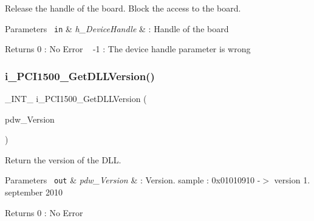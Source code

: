 Release the handle of the board. Block the access to the board.


\begin{DoxyParams}[1]{Parameters}
\mbox{\texttt{ in}}  & {\em h\+\_\+\+Device\+Handle} & \+: Handle of the board\\
\hline
\end{DoxyParams}
\begin{DoxyReturn}{Returns}
0 \+: No Error ~\newline
 -\/1 \+: The device handle parameter is wrong ~\newline

\end{DoxyReturn}
\mbox{\label{group___general_ga0ddc2b5875603b239ed35ff451099799}} 
\subsubsection{\texorpdfstring{i\_PCI1500\_GetDLLVersion()}{i\_PCI1500\_GetDLLVersion()}}
{\footnotesize\ttfamily \+\_\+\+I\+N\+T\+\_\+ i\+\_\+\+P\+C\+I1500\+\_\+\+Get\+D\+L\+L\+Version (\begin{DoxyParamCaption}\item[{P\+D\+W\+O\+RD}]{pdw\+\_\+\+Version }\end{DoxyParamCaption})}

Return the version of the D\+LL.


\begin{DoxyParams}[1]{Parameters}
\mbox{\texttt{ out}}  & {\em pdw\+\_\+\+Version} & \+: Version. sample \+: 0x01010910 -\/$>$ version 1. september 2010\\
\hline
\end{DoxyParams}
\begin{DoxyReturn}{Returns}
0 \+: No Error ~\newline

\end{DoxyReturn}
\mbox{\label{group___general_ga6f3015889b492606932ba26a945b918c}} 
